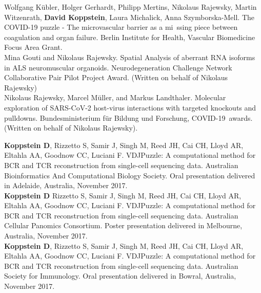 \documentclass[10pt,a4paper]{article}
\begin{document}

{\noindent Wolfgang Kübler, Holger Gerhardt, Philipp Mertins, Nikolaus Rajewsky, Martin Witzenrath, \textbf{David Koppstein}, Laura Michalick, Anna Szymborska-Mell. The COVID-19 puzzle - The microvascular barrier as a mi\
ssing piece between coagulation and organ failure. Berlin Institute for Health, Vascular Biomedicine Focus Area Grant.}  \vspace{0.2em} \\

{\noindent Mina Gouti and Nikolaus Rajewsky. Spatial Analysis of aberrant RNA isoforms in ALS neuromuscular organoids. Neurodegeneration Challenge Network Collaborative Pair Pilot Project Award. (Written on behalf of Nikolaus Rajewsky)} \vspace{0.2em} \\

{\noindent Nikolaus Rajewsky, Marcel Müller, and Markus Landthaler. Molecular exploration of SARS-CoV-2 host-virus interactions with targeted knockouts and pulldowns. Bundesministerium für Bildung und Forschung, COVID-19\
 awards. (Written on behalf of Nikolaus Rajewsky)}. \vspace{0.2em} \\

\spacedhrule{0.1em}{-0.2em}  %

\roottitle{Presentations and Posters}

{\noindent \textbf{Koppstein D}, Rizzetto S, Samir J, Singh M, Reed JH, Cai CH, Lloyd AR, Eltahla AA, Goodnow CC, Luciani F. VDJPuzzle: A computational method for BCR and TCR reconstruction from single-cell sequencing data. Australian Bioinformatics And Computational Biology Society. Oral presentation delivered in Adelaide, Australia, November 2017.} \vspace{-0.8em} \\

{\noindent \textbf{Koppstein D} Rizzetto S, Samir J, Singh M, Reed JH, Cai CH, Lloyd AR, Eltahla AA, Goodnow CC, Luciani F. VDJPuzzle: A computational method for BCR and TCR reconstruction from single-cell sequencing data. Australian Cellular Panomics Consortium. Poster presentation delivered in Melbourne, Australia, November 2017.} \vspace{-0.8em} \\

{\noindent \textbf{Koppstein D}, Rizzetto S, Samir J, Singh M, Reed JH, Cai CH, Lloyd AR, Eltahla AA, Goodnow CC, Luciani F. VDJPuzzle: A computational method for BCR and TCR reconstruction from single-cell sequencing data. Australian Society for Immunology. Oral presentation delivered in Bowral, Australia, November 2017.} \vspace{-0.8em} \\
\end{document}
